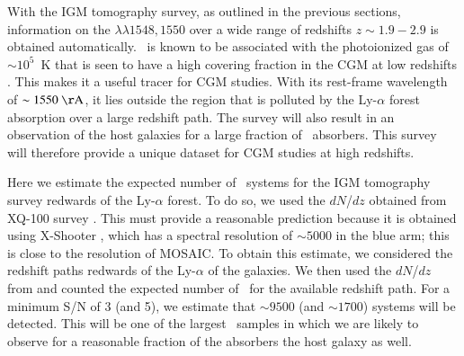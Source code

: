 \documentclass{aa}
\newcommand{\civ}{\ion{C}{iv}}
\begin{document}
With the IGM tomography survey, as outlined in the previous sections, information on the \civ$\lambda\lambda1548,1550$ over a wide range of redshifts $z\sim1.9-2.9$ is obtained automatically. \civ\ is known to be associated with the photoionized gas of $\sim10^5$\, K that is seen to have a high covering fraction in the CGM at low redshifts \citep[e.g., ][]{Bordoloi2014ApJ,Burchett2016ApJ}. This makes  it a useful tracer for CGM studies. With its rest-frame wavelength of $\sim1550~\mathrm{\AA}$, it lies outside the region that is polluted by the Ly-$\alpha$ forest absorption over a large redshift path. The survey will also result in an observation of the host galaxies for a large fraction of \civ\ absorbers. This survey will therefore provide a unique dataset for CGM studies at high redshifts. 

Here we estimate the expected number of \civ\ systems for the IGM tomography survey redwards of the Ly-$\alpha$ forest. To do so, we used the $dN$/$dz$ obtained from XQ-100 survey \citep{Perrotta2016MNRAS}. This must provide a reasonable prediction because it is obtained using X-Shooter \citep{Vernet2011}, which has a spectral resolution of $\sim5000$ in the blue arm; this is close to the resolution of MOSAIC. To obtain this estimate, we considered the redshift paths redwards of the Ly-$\alpha$ of the galaxies. We then used the $dN$/$dz$ from \citet{Perrotta2016MNRAS} and counted the expected number of \civ\ for the available redshift path. For a minimum S/N of 3 (and 5), we estimate that $\sim9500$ (and $\sim1700$) systems will be detected. This will be one of the largest \civ\ samples in which we are likely to observe for a reasonable fraction of the absorbers the host galaxy as well.
\end{document}
